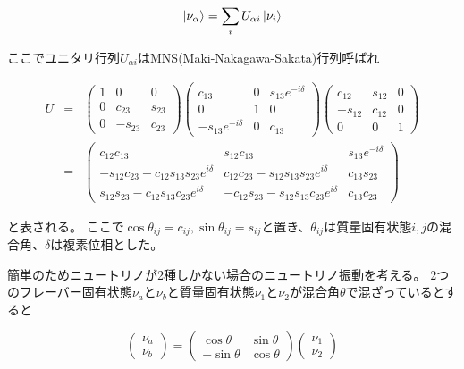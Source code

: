 \documentclass[a4paper,10pt]{jreport}
\begin{document}
\begin{equation} \label{Eq-NeutrinoOscillation1}
	\ket{\nu_{\alpha}}=\sum_i U_{\alpha i}\ket{\nu_i}
\end{equation}

ここでユニタリ行列$U_{\alpha i}$はMNS(Maki-Nakagawa-Sakata)行列呼ばれ

\begin{eqnarray} \label{Eq-Unitary}
U 
&=&
\left(
	\begin{array}{ccc}
		1 & 0 & 0 \\
		0 & c_{23} & s_{23} \\
		0 & -s_{23} & c_{23}
	\end{array}
\right)
\left(
	\begin{array}{ccc}
		c_{13} & 0 & s_{13}e^{-i\delta} \\
		0 & 1 & 0 \\
		-s_{13}e^{-i\delta} & 0 & c_{13}
	\end{array}
\right)
\left(
	\begin{array}{ccc}
		c_{12} & s_{12} & 0 \\
		-s_{12} & c_{12} & 0 \\
		0 & 0 & 1
	\end{array}
\right) \nonumber \\ 
&=&
\left(
	\begin{array}{ccc}
		c_{12}c_{13} & s_{12}c_{13} & s_{13}e^{-i\delta} \\
		-s_{12}c_{23}-c_{12}s_{13}s_{23}e^{i\delta} & c_{12}c_{23}-s_{12}s_{13}s_{23}e^{i\delta} & c_{13}s_{23} \\
		s_{12}s_{23}-c_{12}s_{13}c_{23}e^{i\delta} & -c_{12}s_{23}-s_{12}s_{13}c_{23}e^{i\delta} & c_{13}c_{23}
	\end{array}
\right)
\end{eqnarray}

と表される。
ここで$\cos\theta_{ij}=c_{ij},\sin\theta_{ij}=s_{ij}$と置き、$\theta_{ij}$は質量固有状態$i,j$の混合角、$\delta$は複素位相とした。

簡単のためニュートリノが2種しかない場合のニュートリノ振動を考える。
2つのフレーバー固有状態$\nu_a$と$\nu_b$と質量固有状態$\nu_1$と$\nu_2$が混合角$\theta$で混ざっているとすると

\begin{equation} \label{Eq-NeutrinoOscillation2}
\left(
	\begin{array}{c}
		\nu_a \\
		\nu_b
	\end{array}
\right)
=
\left(
	\begin{array}{cc}
		\cos\theta & \sin\theta \\
		-\sin\theta & \cos\theta 
	\end{array}
\right)
\left(
	\begin{array}{c}
		\nu_1 \\
		\nu_2
	\end{array}
\right)
\end{equation}
\end{document}
